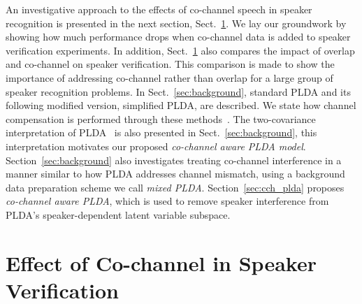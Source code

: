 An investigative approach to the effects of co-channel speech in speaker recognition is presented in the next section, Sect.~\ref{sec:cochannl_in_sid}. 
We lay our groundwork by showing how much performance drops when co-channel data is added to speaker verification experiments. In addition, Sect.~\ref{sec:cochannl_in_sid} also compares the impact of overlap and co-channel on speaker verification. 
This comparison is made to show the importance of addressing co-channel rather than overlap for a large group of speaker recognition problems. 
In Sect.~\ref{sec:background}, standard PLDA and its following modified version, simplified PLDA, are described. 
We state how channel compensation is performed through these methods~\cite{prince_plda,kenny_plda}. 
The two-covariance interpretation of PLDA~\cite{ioffePLDA2006} is also presented in Sect.~\ref{sec:background}, this interpretation motivates our proposed {\it co-channel aware PLDA model}. 
Section~\ref{sec:background} also investigates treating co-channel interference in a manner similar to how PLDA addresses channel mismatch, using a background data preparation scheme we call {\it mixed PLDA}. 
Section~\ref{sec:cch_plda} proposes {\it co-channel aware PLDA}, which is used to remove speaker interference from PLDA's speaker-dependent latent variable subspace. 

\section{Effect of Co-channel in Speaker Verification}
\label{sec:cochannl_in_sid}

